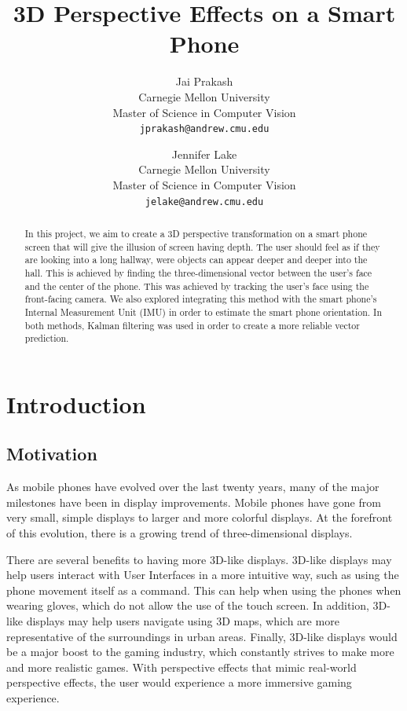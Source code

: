 \documentclass[12pt,twocolumn,letterpaper]{article}
\begin{document}
\title{3D Perspective Effects on a Smart Phone}

\author{Jai Prakash\\
Carnegie Mellon University\\
Master of Science in Computer Vision\\
{\tt\small jprakash@andrew.cmu.edu}
\and
Jennifer Lake\\
Carnegie Mellon University\\
Master of Science in Computer Vision\\
{\tt\small jelake@andrew.cmu.edu}
}

\maketitle

\begin{abstract}
In this project, we aim to create a 3D perspective transformation on a smart phone screen that will give the illusion of screen having depth.  The user should feel as if they are looking into a long hallway, were objects can appear deeper and deeper into the hall. This is achieved by finding the three-dimensional vector between the user’s face and the center of the phone.  This was achieved by tracking the user’s face using the front-facing camera.  We also explored integrating this method with the smart phone's Internal Measurement Unit (IMU) in order to estimate the smart phone orientation. In both methods, Kalman filtering was used in order to create a more reliable vector prediction.
\end{abstract}

\section{Introduction}
\subsection{Motivation}
As mobile phones have evolved over the last twenty years, many of the major milestones have been in display improvements. Mobile phones have gone from very small, simple displays to larger and more colorful displays.  At the forefront of this evolution, there is a growing trend of three-dimensional displays. 

There are several benefits to having more 3D-like displays.  3D-like displays may help users interact with User Interfaces in a more intuitive way, such as using the phone movement itself as a command.  This can help when using the phones when wearing gloves, which do not allow the use of the touch screen.  In addition, 3D-like displays may help users navigate using 3D maps, which are more representative of the surroundings in urban areas. Finally, 3D-like displays would be a major boost to the gaming industry, which constantly strives to make more and more realistic games.  With perspective effects that mimic real-world perspective effects, the user would experience a more immersive gaming experience.
\end{document}
